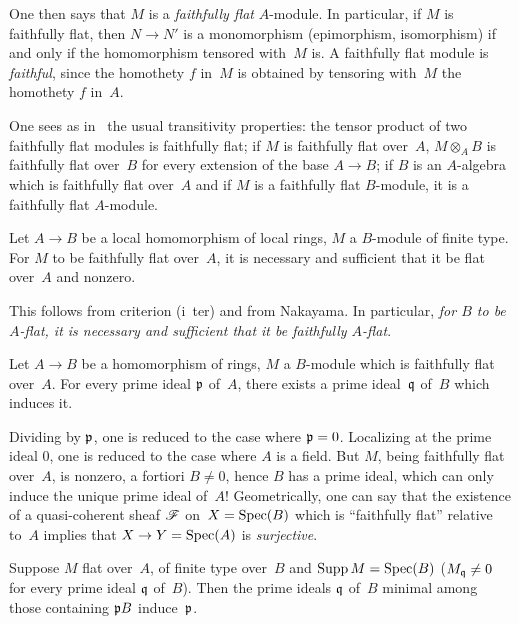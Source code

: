One then says that $M$ is a \emph{faithfully flat} $A$-module. In
particular, if $M$ is faithfully flat, then $N \to N'$ is a
monomorphism (epimorphism, isomorphism) if and only if the
homomorphism tensored with~$M$ is. A faithfully flat module is
\emph{faithful}, since the homothety $f$ in~$M$ is obtained by
tensoring with~$M$ the homothety $f$ in~$A$.

One sees as in~ the usual transitivity properties: the
tensor product of two faithfully flat modules is faithfully flat; if
$M$ is faithfully flat over~$A$, $M \otimes_{A}B$ is faithfully flat
over~$B$ for every extension of the base $A \to B$; if $B$ is an
$A$-algebra which is faithfully flat over~$A$ and if $M$ is a
faithfully flat $B$-module, it is a faithfully flat $A$-module.

\begin{corollary}
\label{IV.2.2}
Let $A \to B$ be a local homomorphism of local rings, $M$ a
$B$-module of finite type. For $M$ to be faithfully flat over~$A$, it
is necessary and sufficient that it be flat over~$A$ and nonzero.
\end{corollary}

This follows from criterion (i~ter) and from Nakayama. In particular,
\emph{for $B$ to be $A$-flat, it is necessary and sufficient that it
be faithfully $A$-flat}.

\begin{proposition}
\label{IV.2.3}
Let $A \to B$ be a homomorphism of rings, $M$ a $B$-module which is
faithfully flat over~$A$. For every prime ideal $\mathfrak{p}$ of~$A$,
there exists a prime ideal~$\mathfrak{q}$ of~$B$ which induces it.
\end{proposition}

Dividing by $\mathfrak{p}$, one is reduced to the case where
$\mathfrak{p}=0$. Localizing at the prime ideal $0$, one is reduced to the
case where $A$ is a field. But $M$, being faithfully flat over~$A$, is
nonzero, a fortiori $B \neq 0$, hence $B$ has a prime ideal, which can
only induce the unique prime ideal of~$A$! Geometrically, one can say
that the existence of a quasi-coherent sheaf $\cal{F}$ on~$X=\operatorname{Spec}
(B)$ which is ``faithfully flat'' relative to~$A$ implies that $X \to
Y=\Spec (A)$ is \emph{surjective}.

\begin{corollary}
\label{IV.2.4}
Suppose $M$ flat over~$A$, of finite type over~$B$ and
$\operatorname{Supp} M=\operatorname{Spec}(B)$ (\ie $M_{\mathfrak{q}}\neq 0$ for every prime ideal
$\mathfrak{q}$ of~$B$). Then the prime ideals $\mathfrak{q}$ of~$B$ minimal
among those containing $\mathfrak{p}B$ induce~$\mathfrak{p}$.
\end{corollary}

